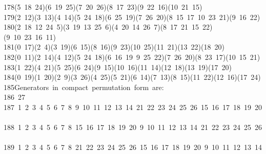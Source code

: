 \begin{tabbing}
178\>(5\ 18\ 24)(6\ 19\ 25)(7\ 20\ 26)(8\ 17\ 23)(9\ 22\ 16)(10\ 21\ 15)\\[0pt]
179\>(2\ 12)(3\ 13)(4\ 14)(5\ 24\ 18)(6\ 25\ 19)(7\ 26\ 20)(8\ 15\ 17\ 10\ 23\ 21)(9\ 16\ 22)\\[0pt]
180\>(2\ 18\ 12\ 24\ 5)(3\ 19\ 13\ 25\ 6)(4\ 20\ 14\ 26\ 7)(8\ 17\ 21\ 15\ 22)(9\ 10\ 23\ 16\ 11)\\[0pt]
181\>(0\ 17)(2\ 4)(3\ 19)(6\ 15)(8\ 16)(9\ 23)(10\ 25)(11\ 21)(13\ 22)(18\ 20)\\[0pt]
182\>(0\ 11)(2\ 14)(4\ 12)(5\ 24\ 18)(6\ 16\ 19\ 9\ 25\ 22)(7\ 26\ 20)(8\ 23\ 17)(10\ 15\ 21)\\[0pt]
183\>(1\ 22)(4\ 21)(5\ 25)(6\ 24)(9\ 15)(10\ 16)(11\ 14)(12\ 18)(13\ 19)(17\ 20)\\[0pt]
184\>(0\ 19)(1\ 20)(2\ 9)(3\ 26)(4\ 25)(5\ 21)(6\ 14)(7\ 13)(8\ 15)(11\ 22)(12\ 16)(17\ 24)\\[0pt]
185\>Generators\ in\ compact\ permutation\ form\ are:\\[0pt]
186\ 27\\[0pt]
187\ 1\ 2\ 3\ 4\ 5\ 6\ 7\ 8\ 9\ 10\ 11\ 12\ 13\ 14\ 21\ 22\ 23\ 24\ 25\ 26\ 15\ 16\ 17\ 18\ 19\ 20\ \\[0pt]
188\ 1\ 2\ 3\ 4\ 5\ 6\ 7\ 8\ 15\ 16\ 17\ 18\ 19\ 20\ 9\ 10\ 11\ 12\ 13\ 14\ 21\ 22\ 23\ 24\ 25\ 26\ \\[0pt]
189\ 1\ 2\ 3\ 4\ 5\ 6\ 7\ 8\ 21\ 22\ 23\ 24\ 25\ 26\ 15\ 16\ 17\ 18\ 19\ 20\ 9\ 10\ 11\ 12\ 13\ 14\ \\[0pt]

\end{tabbing}
